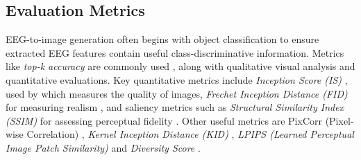 \subsection{Evaluation Metrics} 

EEG-to-image generation often begins with object classification to ensure extracted EEG features contain useful class-discriminative information. Metrics like \textit{top-k accuracy} are commonly used \cite{shimizu2022improving, lan2023seeing, song2023decoding}, along with qualitative visual analysis and quantitative evaluations. Key quantitative metrics include \textit{Inception Score (IS)} \cite{salimans2016improved}, used by \cite{kavasidis2017brain2image, li2020semi, bai2306dreamdiffusion, singh2023eeg2image} which measures the quality of images, \textit{Frechet Inception Distance (FID)} for measuring realism \cite{bai2306dreamdiffusion, singh2024learning, ahmadieh2024visual}, and saliency metrics such as \textit{Structural Similarity Index (SSIM)} for assessing perceptual fidelity \cite{khaleghi2022visual, shimizu2022improving, bai2306dreamdiffusion, ahmadieh2024visual, sugimoto2024image}. Other useful metrics are PixCorr (Pixel-wise Correlation) \cite{shimizu2022improving}, \textit{Kernel Inception Distance (KID)} \cite{singh2024learning}, \textit{LPIPS (Learned Perceptual Image Patch Similarity)} \cite{bai2306dreamdiffusion} and \textit{Diversity Score} \cite{mishra2023neurogan}.

